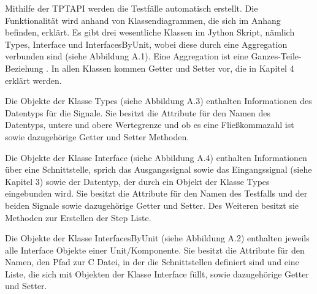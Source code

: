 Mithilfe der TPTAPI werden die Testfälle automatisch erstellt.
Die Funktionalität wird anhand von Klassendiagrammen, die sich im Anhang befinden, erklärt.
Es gibt drei wesentliche Klassen im Jython Skript, nämlich Types, Interface und InterfacesByUnit, wobei diese
durch eine Aggregation verbunden sind (siehe Abbildung A.1). Eine Aggregation ist eine Ganzes-Teile-Beziehung \parencite[S.61 f.]{integration}.
In allen Klassen kommen Getter und Setter vor, die in Kapitel 4 erklärt werden.

Die Objekte der Klasse Types (siehe Abbildung A.3) enthalten Informationen des Datentyps für die Signale.
Sie besitzt die Attribute für den Namen des Datentyps, untere und obere Wertegrenze und ob
es eine Fließkommazahl ist sowie dazugehörige Getter und Setter Methoden.

Die Objekte der Klasse Interface (siehe Abbildung A.4) enthalten Informationen über eine Schnittstelle, sprich das Ausgangssignal sowie das 
Eingangssignal (siehe Kapitel 3) sowie der Datentyp, der durch ein Objekt der Klasse Types eingebunden wird.
Sie besitzt die Attribute für den Namen des Testfalls und der beiden Signale sowie dazugehörige Getter und Setter.
Des Weiteren besitzt sie Methoden zur Erstellen der Step Liste.

Die Objekte der Klasse InterfacesByUnit (siehe Abbildung A.2) enthalten jeweils alle Interface Objekte einer Unit/Komponente.
Sie besitzt die Attribute für den Namen, den Pfad zur C Datei, in der die Schnittstellen definiert sind und
eine Liste, die sich mit Objekten der Klasse Interface füllt, sowie dazugehörige
Getter und Setter.

